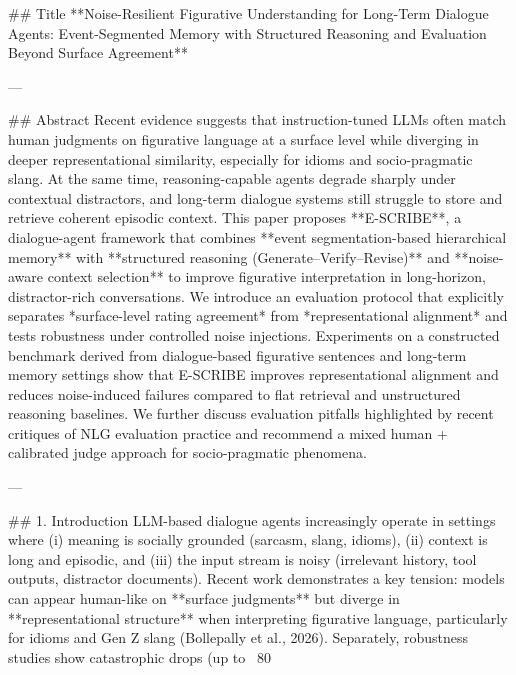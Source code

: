## Title  
**Noise-Resilient Figurative Understanding for Long-Term Dialogue Agents: Event-Segmented Memory with Structured Reasoning and Evaluation Beyond Surface Agreement**

---

## Abstract  
Recent evidence suggests that instruction-tuned LLMs often match human judgments on figurative language at a surface level while diverging in deeper representational similarity, especially for idioms and socio-pragmatic slang. At the same time, reasoning-capable agents degrade sharply under contextual distractors, and long-term dialogue systems still struggle to store and retrieve coherent episodic context. This paper proposes **E-SCRIBE**, a dialogue-agent framework that combines **event segmentation-based hierarchical memory** with **structured reasoning (Generate–Verify–Revise)** and **noise-aware context selection** to improve figurative interpretation in long-horizon, distractor-rich conversations. We introduce an evaluation protocol that explicitly separates *surface-level rating agreement* from *representational alignment* and tests robustness under controlled noise injections. Experiments on a constructed benchmark derived from dialogue-based figurative sentences and long-term memory settings show that E-SCRIBE improves representational alignment and reduces noise-induced failures compared to flat retrieval and unstructured reasoning baselines. We further discuss evaluation pitfalls highlighted by recent critiques of NLG evaluation practice and recommend a mixed human + calibrated judge approach for socio-pragmatic phenomena.

---

## 1. Introduction  
LLM-based dialogue agents increasingly operate in settings where (i) meaning is socially grounded (sarcasm, slang, idioms), (ii) context is long and episodic, and (iii) the input stream is noisy (irrelevant history, tool outputs, distractor documents). Recent work demonstrates a key tension: models can appear human-like on **surface judgments** but diverge in **representational structure** when interpreting figurative language, particularly for idioms and Gen Z slang (Bollepally et al., 2026). Separately, robustness studies show catastrophic drops (up to ~80%


